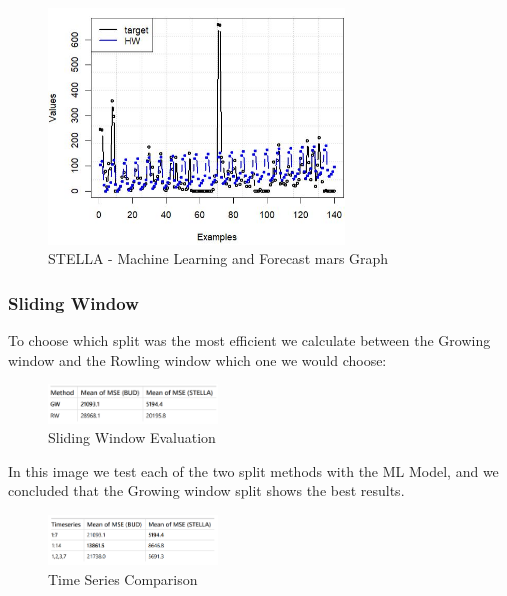 \begin{figure}[H]
    \centering
    \includegraphics[width=0.7\textwidth]{assets/stella-split-graph.jpeg}
    \caption{STELLA - Machine Learning and Forecast mars Graph}
    \label{fig:mulivariate_dataset}
    \end{figure}


\newpage
\subsubsection{Sliding Window}

To choose which split was the most efficient we calculate between the Growing window and the Rowling window which one we would choose:

\begin{figure}[H]
    \centering
    \includegraphics[width=0.4\textwidth]{assets/mult1.png}
    \caption{Sliding Window Evaluation}
    \label{fig:gw_bud}
    \end{figure}

In this image we test each of the two split methods with the ML Model, and we concluded that the Growing window split shows the best results.\\

\begin{figure}[H]
    \centering
    \includegraphics[width=0.4\textwidth]{assets/multi2.png}
    \caption{Time Series Comparison}
    \label{fig:gw_bud}
    \end{figure}

